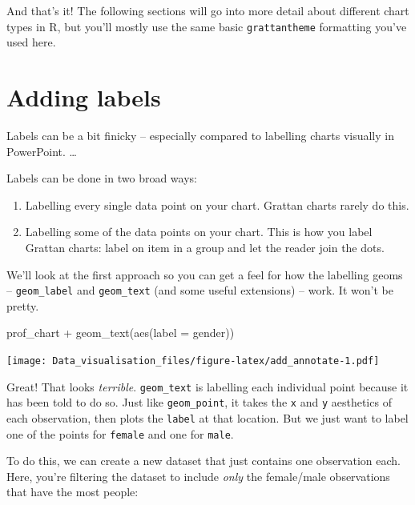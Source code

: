 \documentclass[
]{book}
\newenvironment{Shaded}{\begin{snugshade}}{\end{snugshade}}
\newcommand{\AttributeTok}[1]{\textcolor[rgb]{0.77,0.63,0.00}{#1}}
\newcommand{\FunctionTok}[1]{\textcolor[rgb]{0.00,0.00,0.00}{#1}}
\newcommand{\NormalTok}[1]{#1}
\newcommand{\SpecialCharTok}[1]{\textcolor[rgb]{0.00,0.00,0.00}{#1}}
\providecommand{\tightlist}{%
  \setlength{\itemsep}{0pt}\setlength{\parskip}{0pt}}
\begin{document}
And that's it! The following sections will go into more detail about different chart types in R, but you'll mostly use the same basic \texttt{grattantheme} formatting you've used here.

\hypertarget{adding-labels}{%
\section{Adding labels}\label{adding-labels}}

Labels can be a bit finicky -- especially compared to labelling charts visually in PowerPoint. \ldots{}

Labels can be done in two broad ways:

\begin{enumerate}
\def\labelenumi{\arabic{enumi}.}
\tightlist
\item
  Labelling every single data point on your chart. Grattan charts rarely do this.
\item
  Labelling some of the data points on your chart. This is how you label Grattan charts: label on item in a group and let the reader join the dots.
\end{enumerate}

We'll look at the first approach so you can get a feel for how the labelling geoms -- \texttt{geom\_label} and \texttt{geom\_text} (and some useful extensions) -- work. It won't be pretty.

\begin{Shaded}
\begin{Highlighting}[]
\NormalTok{prof\_chart }\SpecialCharTok{+}
  \FunctionTok{geom\_text}\NormalTok{(}\FunctionTok{aes}\NormalTok{(}\AttributeTok{label =}\NormalTok{ gender))}
\end{Highlighting}
\end{Shaded}

\texttt{[image: Data\_visualisation\_files/figure-latex/add\_annotate-1.pdf]}

Great! That looks \emph{terrible}. \texttt{geom\_text} is labelling each individual point because it has been told to do so. Just like \texttt{geom\_point}, it takes the \texttt{x} and \texttt{y} aesthetics of each observation, then plots the \texttt{label} at that location. But we just want to label one of the points for \texttt{female} and one for \texttt{male}.

To do this, we can create a new dataset that just contains one observation each. Here, you're filtering the dataset to include \emph{only} the female/male observations that have the most people:
\end{document}
